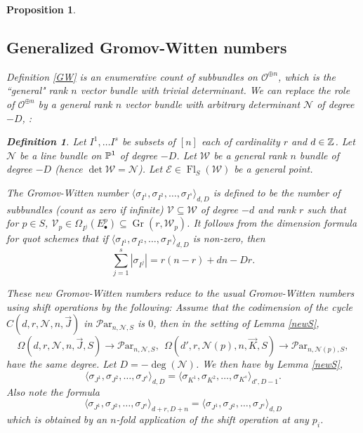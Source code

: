 \documentclass[11pt]{amsart}
\newcommand\me{\mathcal{E}}
\newcommand\Fl{\operatorname{Fl}}
\newcommand\mv{\mathcal{V}}
\newcommand\mw{\mathcal{W}}
\newcommand\mn{\mathcal{N}}
\newcommand\Par{\mathcal{P}\text{ar} }
\newcommand\Gr{\operatorname{Gr}}
\newtheorem{proposition}[theorem]{Proposition}
\newtheorem{defi}[theorem]{Definition}
\numberwithin{theorem}{subsection}
\begin{document}
{\begin{proposition}
 \subsection{Generalized Gromov-Witten numbers}\label{stuffed}
 Definition \ref{GW} is an enumerative count of subbundles on $\mathcal{O}^{\oplus n}$, which is the ``general" rank $n$ vector bundle with trivial determinant. We can replace the role of $\mathcal{O}^{\oplus n}$ by a general rank $n$ vector bundle
with arbitrary determinant $\mathcal{N}$ of degree $-D$, \cite[Definition 2.4]{BHorn}:
\begin{defi}\label{GWgen}
Let $I^1,\dots I^s$ be subsets of $[n]$ each of cardinality $r$ and $d\in\Bbb{Z}$. Let $\mn$ be a line bundle on $\Bbb{P}^1$
of degree $-D$.  Let $\mw$ be a general rank $n$ bundle of degree $-D$ (hence $\det\mw=\mn$).  Let $\me\in\Fl_S(\mw)$ be a general point.

The Gromov-Witten number $\langle\sigma_{I^1}, \sigma_{I^2},\dots,\sigma_{I^s}\rangle_{d,D}$
is defined to be the number of subbundles (count as zero if infinite) $\mv\subseteq \mw$ of degree $-d$ and rank $r$  such that for $p\in S$,
$\mv_p\in\Omega_{I^j}(E^p_{\bullet})\subseteq \Gr(r,\mw_p)$. It follows from the dimension formula for quot schemes that
 if $\langle\sigma_{I^1}, \sigma_{I^2},\dots,\sigma_{I^s}\rangle_{d,D}$ is non-zero, then
 \begin{equation}\label{numerical}
 \sum_{j=1}^s |\sigma_{I^j}| =r(n-r)+dn-Dr.
 \end{equation}

\end{defi}
These new Gromov-Witten numbers reduce to the usual Gromov-Witten numbers using shift operations by the following:
Assume that the  codimension of the cycle $C(d,r,\mn,n,\vec{J})$ in $\Par_{n,\mn,S}$ is $0$, then in the setting of Lemma \ref{newS}, 
$$\Omega(d,r,\mn,n,\vec{J},S)\to \Par_{n,\mn,S}, \ \ \Omega(d',r,\mn(p),n,\vec{K},S)\to \Par_{n,\mn(p),S},$$
 have the same degree. Let $D=-\deg(\mn)$. We then have by Lemma \ref{newS},  
\begin{equation}\label{formula1}
\langle\sigma_{J^1}, \sigma_{J^2},\dots,\sigma_{J^s}\rangle_{d,D}= \langle\sigma_{K^1}, \sigma_{K^2},\dots,\sigma_{K^s}\rangle_{d',D-1}.
\end{equation}
Also note the formula
\begin{equation}\label{formula2}
\langle\sigma_{J^1}, \sigma_{J^2},\dots,\sigma_{J^s}\rangle_{d+r,D+n}=\langle\sigma_{J^1}, \sigma_{J^2},\dots,\sigma_{J^s}\rangle_{d,D}
\end{equation}
 which is obtained by an $n$-fold application of the shift operation at any $p_i$.


\end{proposition}}
\end{document}
